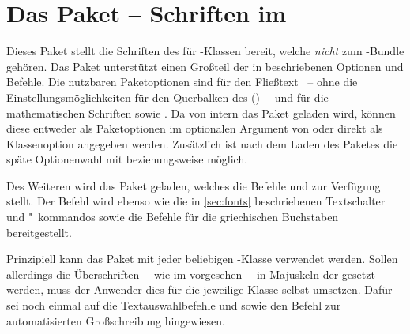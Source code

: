 \bigskip\noindent
{}



\section{Das Paket  -- Schriften im \CD}
%
Dieses Paket stellt die Schriften des \CDs für -Klassen bereit, 
welche \emph{nicht} zum \TUDScript-Bundle gehören. Das Paket unterstützt einen 
Großteil der in  beschriebenen Optionen und Befehle. Die 
nutzbaren Paketoptionen sind für den Fließtext ~-- ohne die 
Einstellungsmöglichkeiten für den Querbalken des \CDs ()~-- und 
für die mathematischen Schriften  sowie . 
Da von  intern das Paket  geladen 
wird, können diese entweder als Paketoptionen im optionalen Argument von 
oder direkt als Klassenoption angegeben werden. Zusätzlich ist nach dem Laden 
des Paketes die späte Optionenwahl mit  beziehungsweise 
 möglich.

Des Weiteren wird das Paket  geladen, welches die Befehle 
 und  zur Verfügung stellt. Der 
Befehl  wird ebenso wie die in \autoref{sec:fonts} beschriebenen 
Textschalter und "~kommandos sowie die Befehle für die griechischen Buchstaben 
bereitgestellt.

Prinzipiell kann das Paket  mit jeder beliebigen 
-Klasse verwendet werden. Sollen allerdings die Überschriften~-- 
wie im \CD vorgesehen~-- in Majuskeln der \DIN gesetzt werden, muss der 
Anwender dies für die jeweilige Klasse selbst umsetzen. Dafür sei noch einmal 
auf die Textauswahlbefehle  und  sowie den Befehl 
 zur automatisierten Großschreibung hingewiesen.

